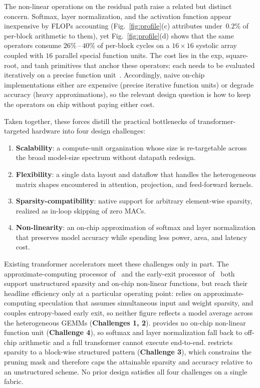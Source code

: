 \documentclass[lettersize,journal]{IEEEtran}
\begin{document}
The non-linear operations on the residual path raise a related but distinct concern. Softmax, layer normalization, and the activation function appear inexpensive by FLOPs accounting (Fig.~\ref{fig:profile}(c) attributes under~$0.2\%$ of per-block arithmetic to them), yet Fig.~\ref{fig:profile}(d) shows that the same operators consume $26\%$\,--\,$40\%$ of per-block cycles on a $16{\times}16$ systolic array coupled with $16$ parallel special function units. The cost lies in the exp, square-root, and tanh primitives that anchor these operators: each needs to be evaluated iteratively on a precise function unit~\cite{Volder1959CORDIC}. Accordingly, naive on-chip implementations either are expensive (precise iterative function units) or degrade accuracy (heavy approximations), so the relevant design question is how to keep the operators on chip without paying either cost.

Taken together, these forces distill the practical bottlenecks of transformer-targeted hardware into four design challenges:
\begin{enumerate}
    \item \textbf{Scalability}: a compute-unit organization whose size is re-targetable across the broad model-size spectrum without datapath redesign.
    \item \textbf{Flexibility}: a single data layout and dataflow that handles the heterogeneous matrix shapes encountered in attention, projection, and feed-forward kernels.
    \item \textbf{Sparsity-compatibility}: native support for arbitrary element-wise sparsity, realized as in-loop skipping of zero MACs.
    \item \textbf{Non-linearity}: an on-chip approximation of softmax and layer normalization that preserves model accuracy while spending less power, area, and latency cost.
\end{enumerate}

Existing transformer accelerators meet these challenges only in part. The approximate-computing processor of~\cite{Yang2022isscc} and the early-exit processor of~\cite{Thierry2023isscc} both support unstructured sparsity and on-chip non-linear functions, but reach their headline efficiency only at a particular operating point: \cite{Yang2022isscc} relies on approximate-computing speculation that assumes simultaneous input and weight sparsity, and \cite{Thierry2023isscc} couples entropy-based early exit, so neither figure reflects a model average across the heterogeneous GEMMs (\textbf{Challenges 1, 2}). \cite{Li2025SparseTrim} provides no on-chip non-linear function unit (\textbf{Challenge 4}), so softmax and layer normalization fall back to off-chip arithmetic and a full transformer cannot execute end-to-end. \cite{Fan2025MultiTaskTransformer} restricts sparsity to a block-wise structured pattern (\textbf{Challenge 3}), which constrains the pruning mask and therefore caps the attainable sparsity and accuracy relative to an unstructured scheme. No prior design satisfies all four challenges on a single fabric.
\end{document}
